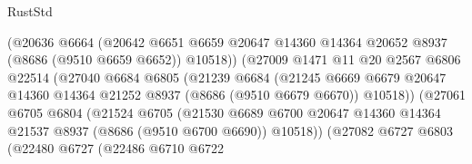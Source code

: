 \begin{lexlean}{RustStd}
\begin{coremodule}
                                (@20636
                                  @6664
                                  (@20642
                                    @6651
                                    @6659
                                    @20647
                                    @14360
                                    @14364
                                    @20652
                                    @8937
                                    (@8686 (@9510 @6659 @6652))
                                    @10518))
                                (@27009
                                  @1471
                                  @11
                                  @20
                                  @2567
                                  @6806
                                  @22514
                                  (@27040
                                    @6684
                                    @6805
                                    (@21239
                                      @6684
                                      (@21245
                                        @6669
                                        @6679
                                        @20647
                                        @14360
                                        @14364
                                        @21252
                                        @8937
                                        (@8686 (@9510 @6679 @6670))
                                        @10518))
                                    (@27061
                                      @6705
                                      @6804
                                      (@21524
                                        @6705
                                        (@21530
                                          @6689
                                          @6700
                                          @20647
                                          @14360
                                          @14364
                                          @21537
                                          @8937
                                          (@8686 (@9510 @6700 @6690))
                                          @10518))
                                      (@27082
                                        @6727
                                        @6803
                                        (@22480
                                          @6727
                                          (@22486
                                            @6710
                                            @6722

\end{coremodule}
\end{lexlean}

